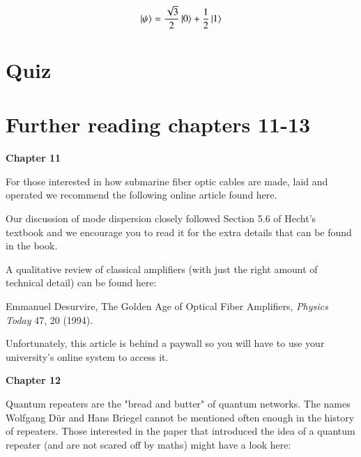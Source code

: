 \newpage
\begin{exercises}
\begin{equation*}
\left| \psi \right\rangle = \frac{\sqrt{3}}{2}\left| 0 \right\rangle + \frac{1}{2}\left| 1 \right\rangle
\end{equation*}


\end{exercises}

\newpage
\section*{Quiz}


\section*{Further reading chapters 11-13}

{\bf Chapter 11}

For those interested in how submarine fiber optic cables are made, laid and operated we recommend the following online article found here.

Our discussion of mode dispersion closely followed Section 5.6 of Hecht’s textbook and we encourage you to read it for the extra details that can be found in the book.

A qualitative review of classical amplifiers (with just the right amount of technical detail) can be found here:

Emmanuel Desurvire, The Golden Age of Optical Fiber Amplifiers, \emph{Physics Today} 47, 20 (1994).

Unfortunately, this article is behind a paywall so you will have to use your university’s online system to access it.

{\bf Chapter 12}

Quantum repeaters are the "bread and butter" of quantum networks. The names Wolfgang D\"ur and Hans Briegel cannot be mentioned often enough in the history of repeaters. Those interested in the paper that introduced the idea of a quantum repeater (and are not scared off by maths) might have a look here:

